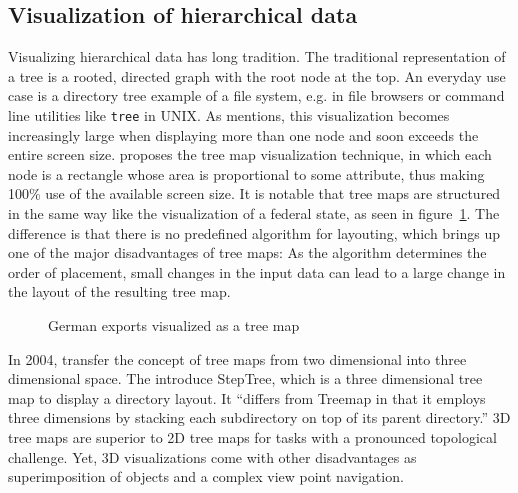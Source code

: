 \documentclass{article}
\begin{document}
\subsection{Visualization of hierarchical data}
Visualizing hierarchical data has long tradition.
The traditional representation of a tree is a rooted, directed graph with the root node at the top.
An everyday use case is a directory tree example of a file system, e.g. in file browsers or command line utilities like \texttt{tree} in UNIX.
As \textcite{Shneiderman1992} mentions, this visualization becomes increasingly large when displaying more than one node and soon exceeds the entire screen size.
\textcite{Johnson1991} proposes the tree map visualization technique, in which each node is a rectangle whose area is proportional to some attribute, thus making 100\% use of the available screen size.
It is notable that tree maps are structured in the same way like the visualization of a federal state, as seen in figure~\ref{fig:research:treemap}.
The difference is that there is no predefined algorithm for layouting, which brings up one of the major disadvantages of tree maps:
As the algorithm determines the order of placement, small changes in the input data can lead to a large change in the layout of the resulting tree map.

\begin{figure}[h]
\centering
\caption{German exports visualized as a tree map}
\label{fig:research:treemap}
\end{figure}

In 2004, \textcite{Bladh2004} transfer the concept of tree maps from two dimensional into three dimensional space.
The introduce StepTree, which is a three dimensional tree map to display a directory layout.
It ``differs from Treemap in that it employs three dimensions by stacking each subdirectory on top of its parent directory.''\cite{Bladh2004}
3D tree maps are superior to 2D tree maps for tasks with a pronounced topological challenge.
Yet, 3D visualizations come with other disadvantages as superimposition of objects and a complex view point navigation.
\end{document}
